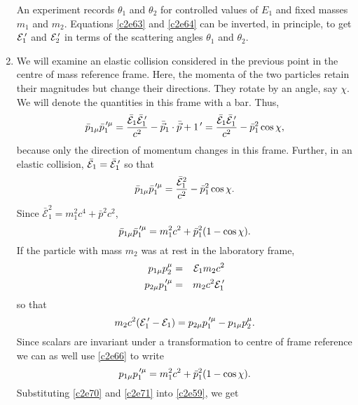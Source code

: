 \begin{enumerate}
An experiment records $\theta_1$ and $\theta_2$ for controlled values of $E_1$
and fixed masses $m_1$ and $m_2$. Equations \eqref{c2e63} and \eqref{c2e64}
can be inverted, in principle, to get $\mathcal{E}_1^{\,\prime}$ and 
$\mathcal{E}_2^{\,\prime}$ in terms of the scattering angles $\theta_1$ and $\theta_2$.

\item We will examine an elastic collision considered in the previous point in 
the centre of mass reference frame. Here, the momenta of the two particles 
retain their magnitudes but change their directions. They rotate by an angle, 
say $\chi$.
We will denote the quantities in this frame with a bar. Thus,
\begin{equation}\label{c2e65}
\bar{p}_{1\mu}\bar{p}_1^{{\,\prime}\mu} = 
\frac{\bar{\mathcal{E}}_1\bar{\mathcal{E}}_1^{\,\prime}}{c^2} - 
\bar{\vec{p}}_1\cdot\bar{\vec{p}}+1^{\,\prime} = 
\frac{\bar{\mathcal{E}}_1\bar{\mathcal{E}}_1^{\,\prime}}{c^2} - 
\bar{p}^2_1\cos\chi,
\end{equation}
because only the direction of momentum changes in this frame. Further, in an
elastic collision, $\bar{\mathcal{E}}_1 = \bar{\mathcal{E}}_1^{\,\prime}$ so that
\begin{equation}\label{c2e66}
\bar{p}_{1\mu}\bar{p}_1^{{\,\prime}\mu} = \frac{\bar{\mathcal{E}}_1^2}{c^2} - 
\bar{p}_1^2\cos\chi.
\end{equation}
Since $\bar{\mathcal{E}}_1^2 = m_1^2c^4 + \bar{p}^2c^2$, 
\begin{equation}\label{c2e67}
\bar{p}_{1\mu}\bar{p}_1^{{\,\prime}\mu} = m_1^2c^2 + \bar{p}_1^2(1 - \cos\chi).
\end{equation}
If the particle with mass $m_2$ was at rest in the laboratory frame,
\begin{eqnarray}
p_{1\mu}p_2^\mu &=& \mathcal{E}_1m_2c^2 \label{c2e68} \\
p_{2\mu}p_1^{{\,\prime}\mu} &=& m_2c^2 \mathcal{E}_1^{\,\prime} \label{c2e69}
\end{eqnarray}
so that
\begin{equation}\label{c2e70}
m_2c^2(\mathcal{E}_1^{\,\prime} - \mathcal{E}_1) = p_{2\mu}p_1^{{\,\prime}\mu} - 
p_{1\mu}p_2^\mu.
\end{equation}
Since scalars are invariant under a transformation to centre of frame reference
we can as well use \eqref{c2e66} to write
\begin{equation}\label{c2e71}
p_{1\mu}p_1^{{\,\prime}\mu} = m_1^2c^2 + \bar{p}_1^2(1 - \cos\chi).
\end{equation}
Substituting \eqref{c2e70} and \eqref{c2e71} into \eqref{c2e59}, we get
\begin{equation}\label{c2e72}

\end{equation}
\end{enumerate}
